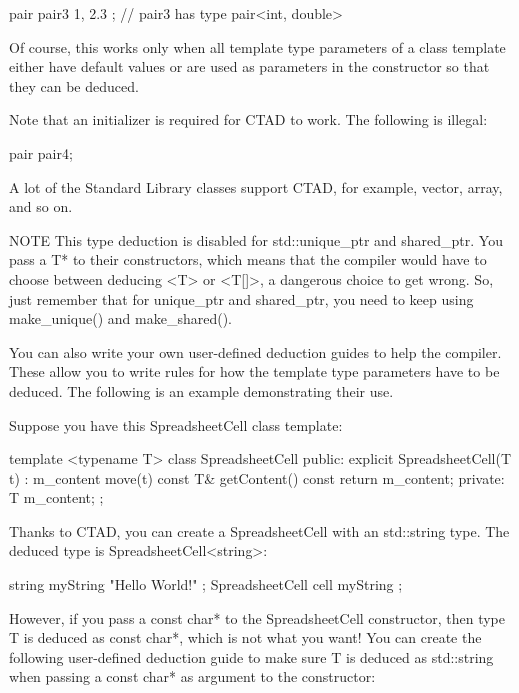 \begin{cpp}
pair pair3 { 1, 2.3 }; // pair3 has type pair<int, double>
\end{cpp}

Of course, this works only when all template type parameters of a class template either have default values or are used as parameters in the constructor so that they can be deduced.

Note that an initializer is required for CTAD to work. The following is illegal:

\begin{cpp}
pair pair4;
\end{cpp}

A lot of the Standard Library classes support CTAD, for example, vector, array, and so on.

\begin{myNotic}{NOTE}
This type deduction is disabled for std::unique\_ptr and shared\_ptr. You pass a T* to their constructors, which means that the compiler would have to choose between deducing <T> or <T[]>, a dangerous choice to get wrong. So, just remember that for unique\_ptr and shared\_ptr, you need to keep using make\_unique() and make\_shared().
\end{myNotic}


You can also write your own user-defined deduction guides to help the compiler. These allow you to write rules for how the template type parameters have to be deduced. The following is an example demonstrating their use.

Suppose you have this SpreadsheetCell class template:

\begin{cpp}
template <typename T>
class SpreadsheetCell
{
    public:
        explicit SpreadsheetCell(T t) : m_content { move(t) } { }
        const T& getContent() const { return m_content; }
    private:
        T m_content;
};
\end{cpp}

Thanks to CTAD, you can create a SpreadsheetCell with an std::string type. The deduced type is SpreadsheetCell<string>:

\begin{cpp}
string myString { "Hello World!" };
SpreadsheetCell cell { myString };
\end{cpp}

However, if you pass a const char* to the SpreadsheetCell constructor, then type T is deduced as const char*, which is not what you want! You can create the following user-defined deduction guide to make sure T is deduced as std::string when passing a const char* as argument to the constructor:

